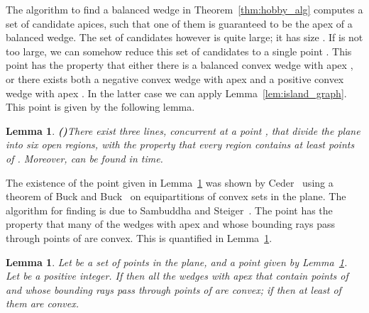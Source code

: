 \documentclass{article}
\newtheorem{lemma}[theorem]{Lemma}
\begin{document}
The algorithm to find a balanced wedge in Theorem~\ref{thm:hobby_alg} computes a set of candidate apices, such that
one of them is guaranteed to be the apex of a balanced wedge. 
The set of candidates however is quite large; it has size . 
If  is not too large, we can somehow reduce this set of candidates 
to a single point . This point has the property that either there is a balanced convex wedge with
apex , or there exists both a negative convex wedge with apex  and a positive convex wedge with
apex . In the latter case we can apply Lemma~\ref{lem:island_graph}.
This point  is given by the following lemma.

\begin{lemma}\textbf{(\cite{ceder, ceder_alg})}\label{lem:ceder}
There exist three lines, concurrent at a point , that divide the plane into six open regions, 
		with the property that every region contains at least  points of . 
Moreover,  can be found in  time.
\end{lemma}

The existence of the point  given in Lemma~\ref{lem:ceder} was shown by Ceder~\cite{ceder} 
	using a theorem of Buck and Buck~\cite{buck} on equipartitions of convex sets in the plane. 
The algorithm for finding  is due to Sambuddha and Steiger~\cite{ceder_alg}.
The point  has the property that many of the wedges with apex  and whose bounding rays pass through points of  are convex. 
This is quantified in Lemma~\ref{lem:many_convex}.

\begin{lemma}\label{lem:many_convex}
Let  be a set of  points in the plane, and  a point given by Lemma~\ref{lem:ceder}. 
Let  be  a positive integer.
If   then all the wedges with apex  that contain
 points of  and whose bounding rays pass through points of  are convex; 
if  then at least  of them are convex.
\end{lemma}
\end{document}
